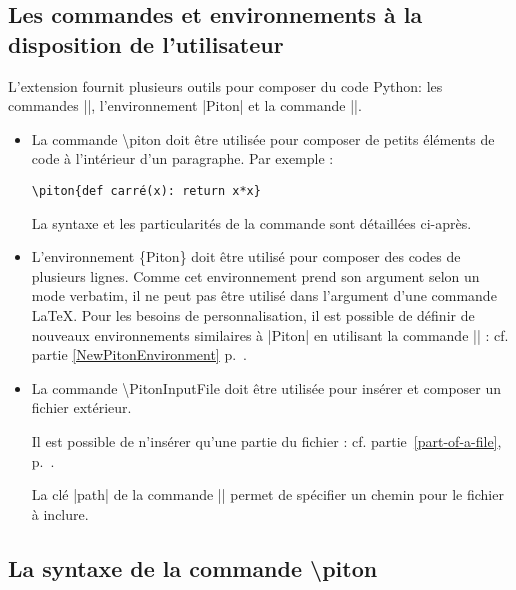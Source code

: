 \documentclass[dvipsnames,svgnames]{article}
\begin{document}
\subsection{Les commandes et environnements à la disposition de l'utilisateur}


L'extension  fournit plusieurs outils pour composer du code Python: les commandes |\piton|,
l'environnement |{Piton}| et la commande |\PitonInputFile|. 

\begin{itemize} \setlength{\fboxsep}{1pt}
\item La commande \colorbox{gray!20}{\ttfamily \textbackslash piton} doit être utilisée pour composer de petits éléments de code à l'intérieur d'un
paragraphe. Par exemple : 

{\color{gray}\verb|\piton{def carré(x): return x*x}|}\qquad 
{}

La syntaxe et les particularités de la commande sont détaillées ci-après.


\item L'environnement \colorbox{gray!20}{\ttfamily \{Piton\}} doit être utilisé pour composer des codes de
plusieurs lignes. Comme cet environnement prend son argument selon un mode verbatim, il ne peut pas être utilisé
dans l'argument d'une commande LaTeX. Pour les besoins de personnalisation, il est possible de définir de nouveaux
environnements similaires à |{Piton}| en utilisant la commande |\NewPitonEnvironment| : cf. partie
\ref{NewPitonEnvironment} p.~\pageref{NewPitonEnvironment}.

\item La commande \colorbox{gray!20}{\ttfamily \textbackslash PitonInputFile} doit être utilisée pour insérer et
composer un fichier extérieur.

Il est possible de n'insérer qu'une partie du fichier : cf. partie~\ref{part-of-a-file},
p.~\pageref{part-of-a-file}.

La clé |path| de la commande |\PitonOptions| permet de spécifier un chemin pour le fichier à inclure. 
\end{itemize}


\subsection{La syntaxe de la commande \textbackslash piton}

\end{document}
